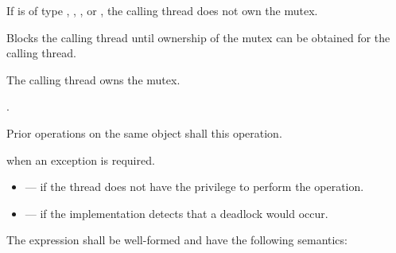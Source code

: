 \begin{itemdescr}
\pnum
\requires If  is of type , ,
, or , the calling
thread does not own the mutex.

\pnum
\effects
Blocks the calling thread until ownership of the mutex can be obtained for the calling thread.

\pnum
\ensures
The calling thread owns the mutex.

\pnum
\returntype {}.

\pnum
\sync
Prior  operations on the same object shall
 this operation.

\pnum
\throws
{} when
an exception is required.

\pnum
\errors
\begin{itemize}
\item {} --- if the thread does not have the
privilege to perform the operation.

\item {} --- if the implementation detects
that a deadlock would occur.
\end{itemize}
\end{itemdescr}

\pnum
The expression  shall be well-formed and have the following semantics:

